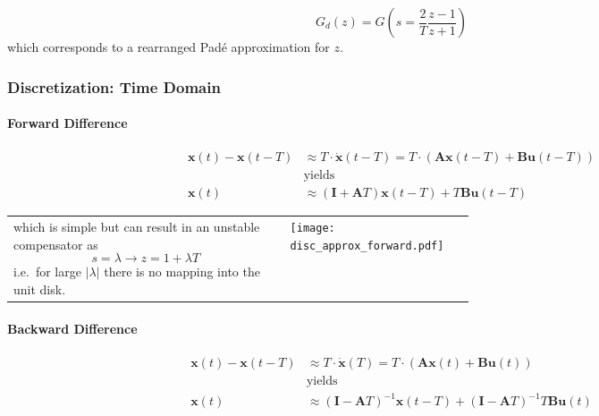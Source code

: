 \begin{equation*}
    G_{d}(z)=G\left(s=\frac2T\frac{z-1}{z+1}\right)
\end{equation*}
which corresponds to a rearranged Padé approximation for $z$.

\subsubsection{Discretization: Time Domain}

\paragraph{Forward Difference}
\noindent\begin{align*}
    \mathbf{x}(t)-\mathbf{x}(t-T) & \approx T\cdot\dot{\mathbf{x}}(t-T) =T\cdot(\mathbf{Ax}(t-T)+\mathbf{Bu}(t-T)) \\
                                  & \text{yields}                                                                  \\
    \mathbf{x}(t)                 & \approx(\mathbf{I}+\mathbf{A}T)\mathbf{x}(t-T)+T\mathbf{Bu}(t-T)
\end{align*}

\begin{tabularx}{\linewidth}{@{}m{0.6\linewidth}X@{}}
    which is simple but can result in an unstable compensator as
    \begin{equation*}
        s=\lambda \rightarrow z=1+\lambda T
    \end{equation*}
    i.e.\ for large $|\lambda|$ there is no mapping into the unit disk.
     &
    \texttt{[image: disc\_approx\_forward.pdf]}
\end{tabularx}

\paragraph{Backward Difference}
\noindent\begin{align*}
    \mathbf{x}(t)-\mathbf{x}(t-T) & \approx T\cdot\dot{\mathbf{x}}(T) =T\cdot(\mathbf{Ax}(t)+\mathbf{Bu}(t))                             \\
                                  & \text{yields}                                                                                        \\
    \mathbf{x}(t)                 & \approx{(\mathbf{I}-\mathbf{A}T)}^{-1}\mathbf{x}(t-T)+{(\mathbf{I}-\mathbf{A}T)}^{-1}T\mathbf{Bu}(t)
\end{align*}

